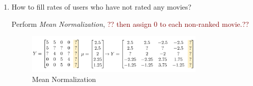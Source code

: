\documentclass[12pt]{article}
\newenvironment{QandA}{\begin{enumerate}[label=\bfseries\arabic*.]\bfseries}
{\end{enumerate}}
\newenvironment{answered}{\par\normalfont\color{Sepia}}{}
\begin{document}
\begin{QandA}
\begin{answered}
\begin{itemize}
            \item \textbf{Content-based recommenders}

            \textbf{Advantages}
                \begin{itemize}
                    \item Works even when a product has no user reviews
                \end{itemize}

            \textbf{Disadvantages}
                \begin{itemize}
                    \item Needs descriptive data for every product that you want to recommend
                    \item Difficult to implement for many kinds of large product databases
                \end{itemize}
        \end{itemize}
    \end{answered}

    \item How to fill rates of users who have not rated any movies?
    \begin{answered}
        Perform \textit{Mean Normalization}, \textcolor{Maroon}{?? then assign 0 to each non-ranked movie.??}
        \begin{figure}[h!]
            \centering
            \includegraphics[width=0.8\textwidth]{mean_normalization.png}
            \caption{Mean Normalization}
            \label{fig:normalization}
        \end{figure}

    \end{answered}

\end{QandA}
\end{document}
